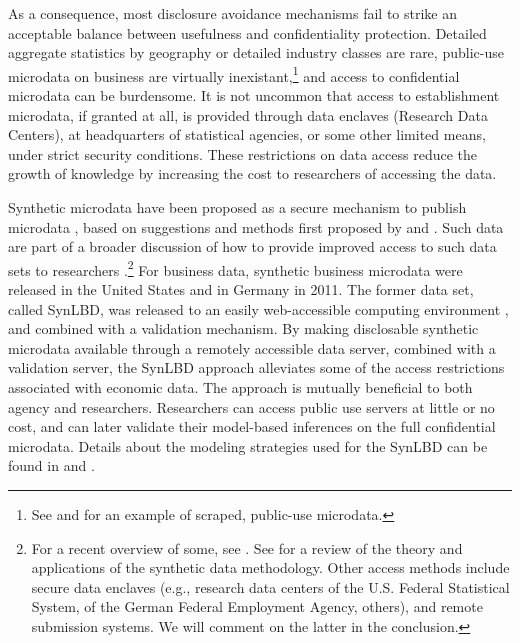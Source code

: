 \documentclass[10pt]{article}
\begin{document}
As a consequence, most disclosure avoidance mechanisms  fail to strike an acceptable balance between usefulness and confidentiality protection. Detailed aggregate statistics by geography or detailed industry classes  are rare, public-use microdata on business are virtually inexistant,\footnote{See \citet{NBERw22095} and \citet{startupcartography} for an example of scraped, public-use microdata.} and access to confidential microdata can be burdensome. It is not uncommon that access to establishment microdata, if granted at all, is provided through data enclaves (Research Data Centers), at headquarters of statistical agencies, or some other limited means, under strict security conditions. These restrictions on data access reduce the growth of knowledge by increasing the cost to researchers of accessing the data.

Synthetic microdata have been proposed as a secure mechanism to publish microdata \citep{drechsler2008,RePEc:taf:japsta:v:39:y:2012:i:2:p:243-265,NAP11844,SJIAOS-2014c}, based on suggestions and methods first proposed by \citet{rubin93} and \citet{little93}. Such data are  part of a broader discussion of how  to provide improved access to such data sets to researchers  \citep{Bender2009,Vilhuber2013,AbowdLane2004,AbowdSchmutte_BPEA2015}.\footnote{For a recent overview of some, see \citet{VilhuberAbowdReiter:Synthetic:SJIAOS:2016}. See \citet{dre:2011} for a review of the theory and applications of the synthetic data methodology.
	Other access methods include secure data enclaves (e.g., research data centers of the U.S. Federal Statistical System, of the  German Federal Employment Agency, others), and  remote submission systems. We will comment on the latter in the conclusion.}
For business data, synthetic business microdata were released in the United States \citep{KinneyEtAl2011} and in Germany  \citep{RePEc:iab:iabfme:201101_de} in 2011. The former data set, called \ac{SynLBD}, was  released to an easily web-accessible computing environment \citep{AbowdVilhuber2010}, and combined with a validation mechanism.  By making disclosable synthetic microdata available through a remotely accessible data server, combined with a validation server, the SynLBD approach alleviates some of the access restrictions associated with economic data. The approach is mutually beneficial to both agency and researchers. Researchers can access public use servers at little or no cost, and can later validate their model-based inferences on the full confidential microdata. Details about the modeling strategies used for the SynLBD   can be found in  \citet{KinneyEtAl2011} 
and \citet{RePEc:cen:tnotes:11-01}.
\end{document}
